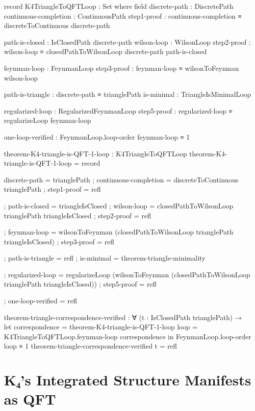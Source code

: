 \documentclass[11pt,a4paper]{book}
\begin{document}
\begin{code}
record K4TriangleToQFTLoop : Set where
  field
    discrete-path : DiscretePath
    continuous-completion : ContinuousPath
    step1-proof : continuous-completion ≡ discreteToContinuous discrete-path
    
    path-is-closed : IsClosedPath discrete-path
    wilson-loop : WilsonLoop
    step2-proof : wilson-loop ≡ closedPathToWilsonLoop discrete-path path-is-closed
    
    feynman-loop : FeynmanLoop
    step3-proof : feynman-loop ≡ wilsonToFeynman wilson-loop
    
    path-is-triangle : discrete-path ≡ trianglePath
    is-minimal : TriangleIsMinimalLoop
    
    regularized-loop : RegularizedFeynmanLoop
    step5-proof : regularized-loop ≡ regularizeLoop feynman-loop
    
    one-loop-verified : FeynmanLoop.loop-order feynman-loop ≡ 1

theorem-K4-triangle-is-QFT-1-loop : K4TriangleToQFTLoop
theorem-K4-triangle-is-QFT-1-loop = record
  { discrete-path = trianglePath
  ; continuous-completion = discreteToContinuous trianglePath
  ; step1-proof = refl
  
  ; path-is-closed = triangleIsClosed
  ; wilson-loop = closedPathToWilsonLoop trianglePath triangleIsClosed
  ; step2-proof = refl
  
  ; feynman-loop = wilsonToFeynman (closedPathToWilsonLoop trianglePath triangleIsClosed)
  ; step3-proof = refl
  
  ; path-is-triangle = refl
  ; is-minimal = theorem-triangle-minimality
  
  ; regularized-loop = regularizeLoop (wilsonToFeynman (closedPathToWilsonLoop trianglePath triangleIsClosed))
  ; step5-proof = refl
  
  ; one-loop-verified = refl
  }

theorem-triangle-correspondence-verified : 
  ∀ (t : IsClosedPath trianglePath) →
  let correspondence = theorem-K4-triangle-is-QFT-1-loop
      loop = K4TriangleToQFTLoop.feynman-loop correspondence
  in FeynmanLoop.loop-order loop ≡ 1
theorem-triangle-correspondence-verified t = refl

\end{code}

\section{K₄'s Integrated Structure Manifests as QFT}
\end{document}
